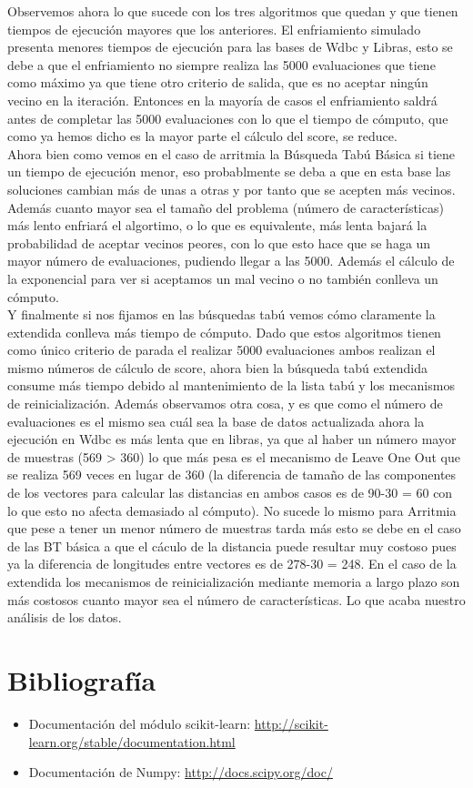 \documentclass[10pt,a4paper]{article}
\begin{document}
Observemos ahora lo que sucede con los tres algoritmos que quedan y que tienen tiempos de ejecución mayores que los anteriores. El enfriamiento simulado presenta menores tiempos de ejecución para las bases de Wdbc y Libras, esto se debe a que el enfriamiento no siempre realiza las 5000 evaluaciones que tiene como máximo ya que tiene otro criterio de salida, que es no aceptar ningún vecino en la iteración. Entonces en la mayoría de casos el enfriamiento saldrá antes de completar las 5000 evaluaciones con lo que el tiempo de cómputo, que como ya hemos dicho es la mayor parte el cálculo del score, se reduce.\\

Ahora bien como vemos en el caso de arritmia la Búsqueda Tabú Básica si tiene un tiempo de ejecución menor, eso probablmente se deba a que en esta base las soluciones cambian más de unas a otras y por tanto que se acepten más vecinos. Además cuanto mayor sea el tamaño del problema (número de características) más lento enfriará el algortimo, o lo que es equivalente, más lenta bajará la probabilidad de aceptar vecinos peores, con lo que esto hace que se haga un mayor número de evaluaciones, pudiendo llegar a las 5000. Además el cálculo de la exponencial para ver si aceptamos un mal vecino o no también conlleva un cómputo.\\

Y finalmente si nos fijamos en las búsquedas tabú vemos cómo claramente la extendida conlleva más tiempo de cómputo. Dado que estos algoritmos tienen como único criterio de parada el realizar 5000 evaluaciones ambos realizan  el mismo números de cálculo de score, ahora bien la búsqueda tabú extendida consume más tiempo debido al mantenimiento de la lista tabú y los mecanismos de reinicialización. Además observamos otra cosa, y es que como el número de evaluaciones es el mismo sea cuál sea la base de datos actualizada ahora la ejecución en Wdbc es más lenta que en libras, ya que al haber un número mayor de muestras (569 > 360) lo que más pesa es el mecanismo de Leave One Out que se realiza 569 veces en lugar de 360 (la diferencia de tamaño de las componentes de los vectores para calcular las distancias en ambos casos es de 90-30 = 60 con lo que esto no afecta demasiado al cómputo). No sucede lo mismo para Arritmia que pese a tener un menor número de muestras tarda más esto se debe en el caso de las BT básica a que el cáculo de la distancia puede resultar muy costoso pues ya la diferencia de longitudes entre vectores es de 278-30 = 248. En el caso de la extendida los mecanismos de reinicialización mediante memoria a largo plazo son más costosos cuanto mayor sea el número de características. Lo que acaba nuestro análisis de los datos.

\newpage
\section{\color[rgb]{0.0,0.0,0.21}Bibliografía}

\begin{itemize}
\item Documentación del módulo scikit-learn: \url{http://scikit-learn.org/stable/documentation.html}
\item Documentación de Numpy: \url{http://docs.scipy.org/doc/}
\end{itemize}
\end{document}
